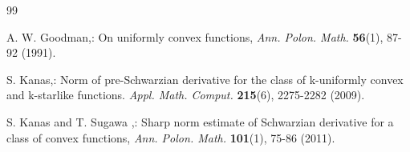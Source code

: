 \documentclass[a4paper,12pt]{amsart}
\theoremstyle{plain}
\theoremstyle{definition}
\theoremstyle{plain}
\begin{document}
\begin{thebibliography}{99}


 {\sc A. W. Goodman},: On uniformly convex functions, \textit{Ann. Polon. Math.} \textbf{56}(1), 87-92 (1991). 







 {\sc S. Kanas},: Norm of pre-Schwarzian derivative for the class of k-uniformly convex and k-starlike
functions. \textit{Appl. Math. Comput.} \textbf{215}(6), 2275-2282 (2009). 

 {\sc S. Kanas} and {\sc T. Sugawa },: Sharp norm estimate of Schwarzian derivative for a class of convex functions, \textit{Ann. Polon. Math.} \textbf{101}(1), 75-86 (2011). 



\end{thebibliography}
\end{document}
